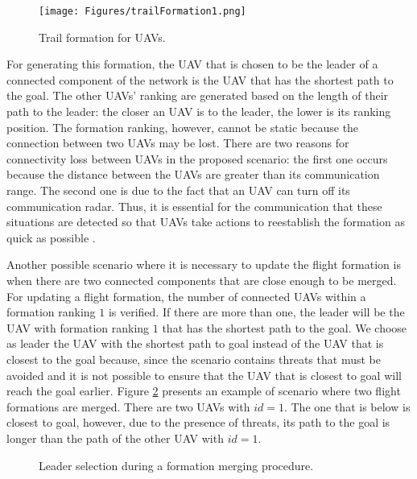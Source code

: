 \begin{figure}[ht]
\centering
\texttt{[image: Figures/trailFormation1.png]}
\caption{Trail formation for UAVs.}
\label{fig:trailFormation1}
\end{figure}

For generating this formation, the UAV that is chosen to be the leader of a connected component of the network is the UAV that has the shortest path to the goal. The other UAVs' ranking are generated based on the length of their path to the leader: the closer an UAV is to the leader, the lower is its ranking position. The formation ranking, however, cannot be static because the connection between two UAVs may be lost. There are two reasons for connectivity loss between UAVs in the proposed scenario: the first one occurs because the distance between the UAVs are greater than its communication range. The second one is due to the fact that an UAV can turn off its communication radar. Thus, it is essential for the communication that these situations are detected so that UAVs take actions to reestablish the formation as quick as possible \cite{giulietti_2000}. 

Another possible scenario where it is necessary to update the flight formation is when there are two connected components that are close enough to be merged. For updating  a flight formation, the number of connected UAVs within a formation ranking $1$ is verified. If there are more than one, the leader will be the UAV with formation ranking $1$ that has the shortest path to the goal. We choose as leader the UAV with the shortest path to goal instead of the UAV that is closest to the goal because, since the scenario contains threats that must be avoided and it is not possible to ensure that the UAV that is closest to goal will reach the goal earlier. Figure \ref{fig:trailFormation0} presents an example of scenario where two flight formations are merged. There are two UAVs with $id=1$. The one that is below is closest to goal, however, due to the presence of threats, its path to the goal is longer than the path of the other UAV with $id=1$.

\begin{figure}[hbt!]
      \centering            
      \caption{Leader selection during a formation merging procedure.}     
      \label{fig:trailFormation0}
\end{figure}


